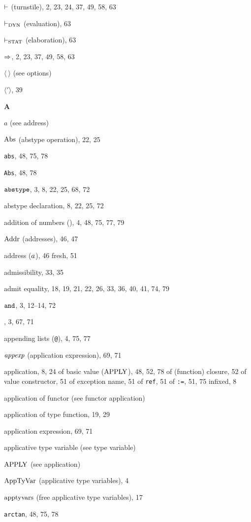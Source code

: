 \begin{theindex}
\item $\vdash$ (turnstile), 2, 23, 24, 37, 49, 58, 63
\item $\vdash_{\rm DYN}$ (evaluation), 63
\item $\vdash_{\rm STAT}$ (elaboration), 63
\item $\Rightarrow$, 2, 23, 37, 49, 58, 63
\item $\langle\ \rangle$ (see options) 
\item $\langle'\rangle$, 39
\indexspace
\parbox{65mm}{\hfil{\large\bf A}\hfil}
\indexspace
\item $a$ (see address) 
\item $\mathop{\rm Abs}\nolimits$ (abstype operation), 22, 25
\item {\tt abs}, 48, 75, 78
\item {\tt Abs}, 48, 78
\item ${\tt abstype}$, 3, 8, 22, 25, 68, 72
\item abstype declaration, 8, 22, 25, 72
\item addition of numbers (\ml{+}), 4, 48, 75, 77, 79
\item ${\rm Addr}$ (addresses), 46, 47
\item address ($a$), 46
\subitem fresh, 51
\item admissibility, 33, 35
\item admit equality, 18, 19, 21, 22, 26, 33, 36, 40, 41, 74, 79
\item ${\tt and}$, 3, 12--14, 72
\item \ANDALSO, 3, 67, 71
\item appending lists (\verb+@+), 4, 75, 77
\item ${\it appexp}$ (application expression), 69, 71
\item application, 8, 24
\subitem of basic value (${\rm APPLY}$), 48, 52, 78
\subitem of (function) closure, 52
\subitem of value constructor, 51
\subitem of exception name, 51
\subitem of {\tt ref}, 51
\subitem of {\tt :=}, 51, 75
\subitem infixed, 8
\item application of functor (see functor application) 
\item application of type function, 19, 29
\item application expression, 69, 71
\item applicative type variable (see type variable) 
\item ${\rm APPLY}$ (see application) 
\item ${\rm AppTyVar}$ (applicative type variables), 4
\item $\mathop{\rm apptyvars}\nolimits$ (free applicative type variables), 17
\item {\tt arctan}, 48, 75, 78

\end{theindex}
